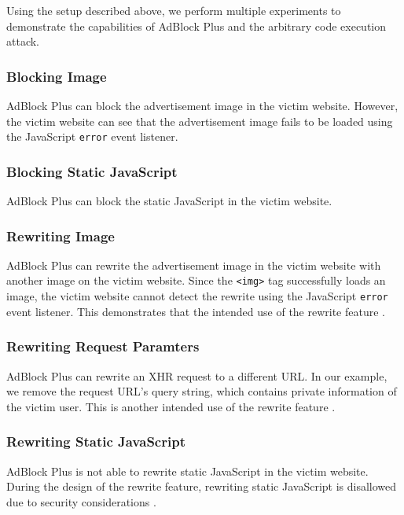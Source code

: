 \documentclass[conference]{IEEEtran}
\begin{document}
Using the setup described above, we perform multiple experiments to demonstrate the capabilities of AdBlock Plus and the arbitrary code execution attack.

\subsubsection{Blocking Image}

AdBlock Plus can block the advertisement image in the victim website. However, the victim website can see that the advertisement image fails to be loaded using the JavaScript \lstinline{error} event listener.

\subsubsection{Blocking Static JavaScript}

AdBlock Plus can block the static JavaScript in the victim website.

\subsubsection{Rewriting Image}

AdBlock Plus can rewrite the advertisement image in the victim website with another image on the victim website. Since the \lstinline{<img>} tag successfully loads an image, the victim website cannot detect the rewrite using the JavaScript \lstinline{error} event listener. This demonstrates that the intended use of the rewrite feature \cite{abp_filter_guide}.

\subsubsection{Rewriting Request Paramters}

AdBlock Plus can rewrite an XHR request to a different URL. In our example, we remove the request URL's query string, which contains private information of the victim user. This is another intended use of the rewrite feature \cite{abp_issue_6622}.

\subsubsection{Rewriting Static JavaScript}

AdBlock Plus is not able to rewrite static JavaScript in the victim website. During the design of the rewrite feature, rewriting static JavaScript is disallowed due to security considerations \cite{abp_issue_6622}.
\end{document}
